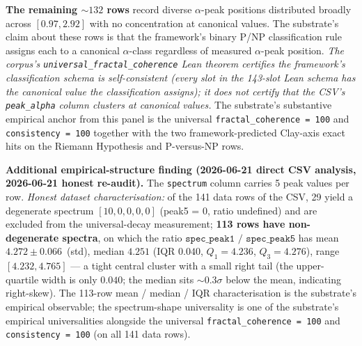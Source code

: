 \documentclass[11pt,a4paper]{amsart}
\theoremstyle{plain}
\theoremstyle{definition}
\begin{document}
\textbf{The remaining $\sim 132$ rows} record diverse $\alpha$-peak positions distributed broadly across $[0.97, 2.92]$ with no concentration at canonical values. The substrate's claim about these rows is that the framework's binary P/NP classification rule assigns each to a canonical $\alpha$-class regardless of measured $\alpha$-peak position. \emph{The corpus's \texttt{universal\_fractal\_coherence} Lean theorem certifies the framework's classification schema is self-consistent (every slot in the 143-slot Lean schema has the canonical value the classification assigns); it does not certify that the CSV's \texttt{peak\_alpha} column clusters at canonical values.} The substrate's substantive empirical anchor from this panel is the universal \texttt{fractal\_coherence = 100} and \texttt{consistency = 100} together with the two framework-predicted Clay-axis exact hits on the Riemann Hypothesis and P-versus-NP rows.

\textbf{Additional empirical-structure finding (2026-06-21 direct CSV analysis, 2026-06-21 honest re-audit).} The \texttt{spectrum} column carries 5 peak values per row. \emph{Honest dataset characterisation:} of the 141 data rows of the CSV, 29 yield a degenerate spectrum $[10, 0, 0, 0, 0]$ (peak5 = 0, ratio undefined) and are excluded from the universal-decay measurement; \textbf{113 rows have non-degenerate spectra}, on which the ratio $\texttt{spec\_peak1 / spec\_peak5}$ has mean $4.272 \pm 0.066$~(std), median $4.251$ (IQR $0.040$, $Q_1 = 4.236$, $Q_3 = 4.276$), range $[4.232, 4.765]$ --- a tight central cluster with a small right tail (the upper-quartile width is only $0.040$; the median sits $\sim 0.3\sigma$ below the mean, indicating right-skew). The 113-row mean / median / IQR characterisation is the substrate's empirical observable; the spectrum-shape universality is one of the substrate's empirical universalities alongside the universal \texttt{fractal\_coherence = 100} and \texttt{consistency = 100} (on all 141 data rows).
\end{document}
